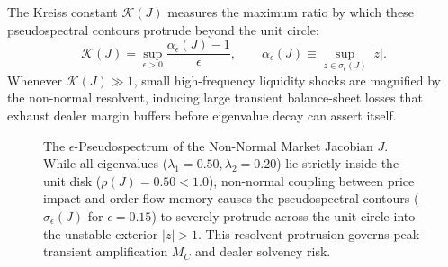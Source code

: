 \documentclass[12pt]{article}
\theoremstyle{definition}
\theoremstyle{remark}
\begin{document}
The Kreiss constant $\mathcal{K}(J)$ measures the maximum ratio by which these pseudospectral contours protrude beyond the unit circle:
\begin{equation}
\mathcal{K}(J) = \sup_{\epsilon > 0} \frac{\alpha_\epsilon(J) - 1}{\epsilon}, \qquad \alpha_\epsilon(J) \equiv \sup_{z \in \sigma_\epsilon(J)} |z|.
\end{equation}
Whenever $\mathcal{K}(J) \gg 1$, small high-frequency liquidity shocks are magnified by the non-normal resolvent, inducing large transient balance-sheet losses that exhaust dealer margin buffers before eigenvalue decay can assert itself.

\begin{figure}[tbp]
\centering
{}
\caption{The $\epsilon$-Pseudospectrum of the Non-Normal Market Jacobian $J$. While all eigenvalues ($\lambda_1 = 0.50, \lambda_2 = 0.20$) lie strictly inside the unit disk ($\rho(J) = 0.50 < 1.0$), non-normal coupling between price impact and order-flow memory causes the pseudospectral contours ($\sigma_\epsilon(J)$ for $\epsilon = 0.15$) to severely protrude across the unit circle into the unstable exterior $|z| > 1$. This resolvent protrusion governs peak transient amplification $M_C$ and dealer solvency risk.}
\label{fig:pseudospectrum}
\end{figure}
\end{document}
